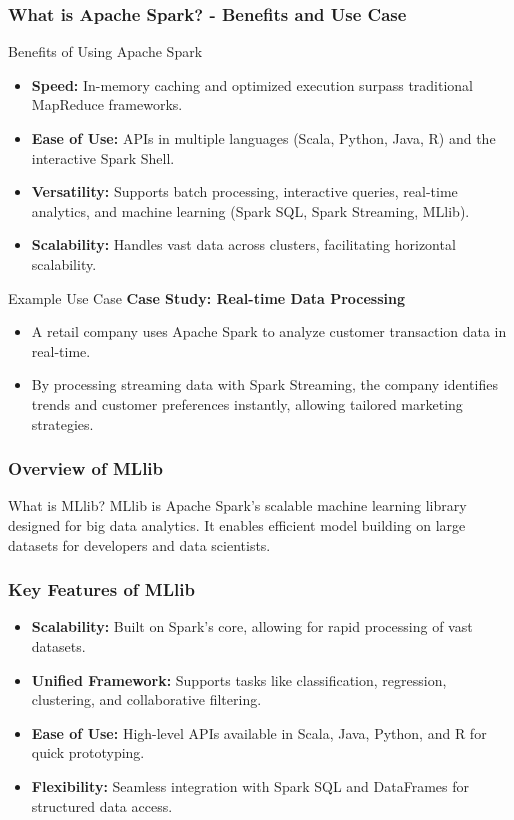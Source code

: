 \documentclass[aspectratio=169]{beamer}
\begin{document}
\begin{frame}[fragile]
    \frametitle{What is Apache Spark? - Benefits and Use Case}
    \begin{block}{Benefits of Using Apache Spark}
        \begin{itemize}
            \item \textbf{Speed:} In-memory caching and optimized execution surpass traditional MapReduce frameworks.
            \item \textbf{Ease of Use:} APIs in multiple languages (Scala, Python, Java, R) and the interactive Spark Shell.
            \item \textbf{Versatility:} Supports batch processing, interactive queries, real-time analytics, and machine learning (Spark SQL, Spark Streaming, MLlib).
            \item \textbf{Scalability:} Handles vast data across clusters, facilitating horizontal scalability.
        \end{itemize}
    \end{block}
    
    \begin{block}{Example Use Case}
        \textbf{Case Study: Real-time Data Processing}
        \begin{itemize}
            \item A retail company uses Apache Spark to analyze customer transaction data in real-time.
            \item By processing streaming data with Spark Streaming, the company identifies trends and customer preferences instantly, allowing tailored marketing strategies.
        \end{itemize}
    \end{block}
\end{frame}

\begin{frame}[fragile]
    \frametitle{Overview of MLlib}
    \begin{block}{What is MLlib?}
        MLlib is Apache Spark's scalable machine learning library designed for big data analytics. It enables efficient model building on large datasets for developers and data scientists.
    \end{block}
\end{frame}

\begin{frame}[fragile]
    \frametitle{Key Features of MLlib}
    \begin{itemize}
        \item \textbf{Scalability:} Built on Spark's core, allowing for rapid processing of vast datasets.
        \item \textbf{Unified Framework:} Supports tasks like classification, regression, clustering, and collaborative filtering.
        \item \textbf{Ease of Use:} High-level APIs available in Scala, Java, Python, and R for quick prototyping.
        \item \textbf{Flexibility:} Seamless integration with Spark SQL and DataFrames for structured data access.
    \end{itemize}
\end{frame}
\end{document}

